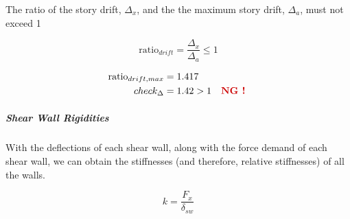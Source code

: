 \documentclass[11pt]{article}
\def\gt{>}
\begin{document}
    The ratio of the story drift, \(\Delta_x\), and the the maximum story
drift, \(\Delta_a\), must not exceed 1

\[
\text{ratio}_{drift} = \frac{\Delta_x}{\Delta_a} \leq 1
\]

    \begin{equation*}
\begin{aligned}
\mathrm{ratio}_{drift,max} &= 1.417 \; 
\\
check_{\Delta} &= 1.42 \gt 1 \quad \textbf{{\color{NG}NG !}} \; 
\end{aligned}
\end{equation*}

    
    \subparagraph{Shear Wall Rigidities}\label{shear-wall-rigidities}

With the deflections of each shear wall, along with the force demand of
each shear wall, we can obtain the stiffnesses (and therefore, relative
stiffnesses) of all the walls.

\[
k = \frac{F_x}{\delta_{sw}}
\]
\end{document}
